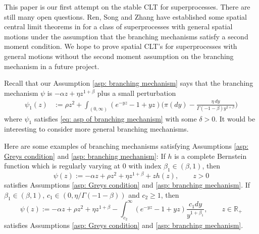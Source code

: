 \documentclass[12pt,a4paper]{amsart}
\theoremstyle{plain}
\theoremstyle{definition}
\numberwithin{equation}{section}
\begin{document}
This paper is our first attempt on the stable CLT for superprocesses.
There are still many open questions.
Ren, Song and Zhang have established some spatial  central limit theorems in \cite{RenSongZhang2015Central} for a class of superprocesses with general spatial motions under the assumption that the branching mechanisms satisfy a second moment condition.
We hope to prove spatial CLT's for superprocesses with general motions without the second moment assumption on the branching mechanism in a future project.

Recall that our Assumption \ref{asp: branching mechanism} says that the branching mechanism $\psi$ is $-\alpha z +\eta z^{1+\beta}$ plus a small perturbation
\begin{align}
  \label{eq: psi 1}
	\psi_1(z)
	& := \rho z^2+ \int_{(0,\infty)}(e^{-yz}-1+yz) \Big(\pi(dy) - \frac{\eta~dy}{\Gamma(-1-\beta) y^{2+\beta}}\Big)
\end{align}
where $\psi_1$ satisfies \eqref{eq: asp of branching mechanism} with some $\delta>0$.
It would be interesting to consider more general branching mechanisms.

Here are some examples of branching mechanisms satisfying Assumptions \ref{asp: Greys condition} and \ref{asp: branching mechanism}:
If $h$ is a complete Bernstein function which is regularly varying at 0 with index $\beta_1\in (\beta, 1)$, then
\[
  \psi(z)
  := -\alpha z + \rho z^2+\eta z^{1+\beta}+zh(z)
  , \qquad z>0
\]
satisfies Assumptions \ref{asp: Greys condition} and \ref{asp: branching mechanism}.
If $\beta_1\in (\beta, 1)$, $c_1\in (0, \eta/\Gamma(-1-\beta))$ and $c_2\ge 1$, then
\[
  \psi(z)
  :=-\alpha z + \rho z^2+\eta z^{1+\beta}-\int^\infty_{c_2} (e^{-yz}-1+yz)\frac{c_1dy}{y^{1+\beta_1}}
  , \qquad z\in \mathbb R_+
\]
satisfies Assumptions \ref{asp: Greys condition} and \ref{asp: branching mechanism}.
\end{document}
